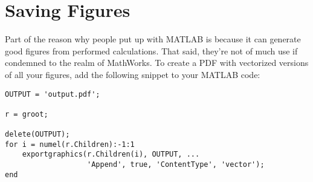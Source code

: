 \documentclass{article}
\begin{document}
\section{Saving Figures}

Part of the reason why people put up with MATLAB is because it can
generate good figures from performed calculations.  That said, they're
not of much use if condemned to the realm of MathWorks.  To create a PDF
with vectorized versions of all your figures, add the following snippet
to your MATLAB code:

\begin{verbatim}
OUTPUT = 'output.pdf';

r = groot;

delete(OUTPUT);
for i = numel(r.Children):-1:1
    exportgraphics(r.Children(i), OUTPUT, ...
                   'Append', true, 'ContentType', 'vector');
end
\end{verbatim}
\end{document}
